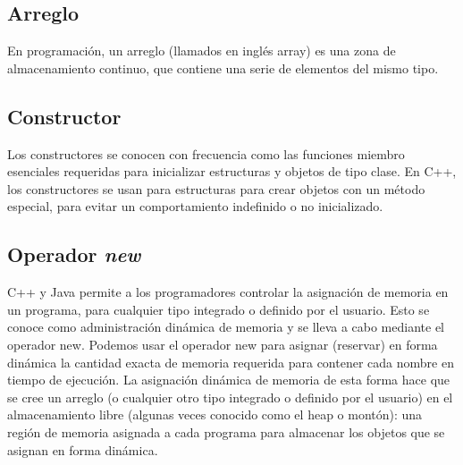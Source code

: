 \subsection{Arreglo}
En programación, un arreglo (llamados en inglés array) es una zona de almacenamiento continuo, que contiene una serie de elementos del mismo tipo.

\subsection{Constructor}

Los constructores se conocen con frecuencia como las funciones miembro esenciales requeridas
para inicializar estructuras y objetos de tipo clase. En C++, los constructores se usan para estructuras para crear objetos con un método especial, para evitar un comportamiento indefinido o no inicializado.

\subsection{Operador \emph{new}}
C++ y Java permite a los programadores controlar la asignación de memoria en un programa,
para cualquier tipo integrado o definido por el usuario. Esto se conoce como administración dinámica de memoria y se lleva a cabo mediante el operador new. Podemos usar el operador new
para asignar (reservar) en forma dinámica la cantidad exacta de memoria requerida para contener
cada nombre en tiempo de ejecución. La asignación dinámica de memoria de esta forma hace que
se cree un arreglo (o cualquier otro tipo integrado o definido por el usuario) en el almacenamiento
libre (algunas veces conocido como el heap o montón): una región de memoria asignada a cada
programa para almacenar los objetos que se asignan en forma dinámica.